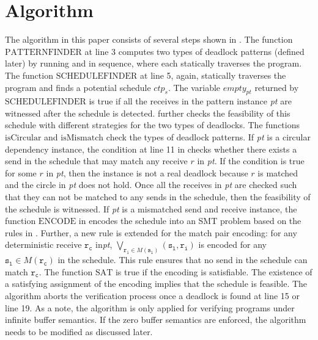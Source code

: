 \section{Algorithm}

\examplefigone

The algorithm in this paper consists of several steps shown in . The function $\mathrm{PATTERNFINDER}$ at line 3 computes two types of deadlock patterns (defined later) by running  and  in sequence, where each statically traverses the program. The function $\mathrm{SCHEDULEFINDER}$ at line 5, again, statically traverses the program and finds a potential schedule $\mathit{ctp}_s$. The variable $\mathit{empty}_{pt}$ returned by $\mathrm{SCHEDULEFINDER}$ is true if all the receives in the pattern instance \textit{pt} are witnessed after the schedule is detected.  further checks the feasibility of this schedule with different strategies for the two types of deadlocks. The functions $\mathrm{isCircular}$ and $\mathrm{isMismatch}$ check the types of deadlock patterns. If \textit{pt} is a circular dependency instance, the condition at line 11 in  checks whether there exists a send in the schedule that may match any receive $\mathit{r}$ in \textit{pt}. If the condition is true for some $\mathit{r}$ in \textit{pt}, then the instance is not a real deadlock because $\mathit{r}$ is matched and the circle in \textit{pt} does not hold. Once all the receives in \textit{pt} are checked such that they can not be matched to any sends in the schedule, then the feasibility of the schedule is witnessed. If \textit{pt} is a mismatched send and receive instance, the function $\mathrm{ENCODE}$ in  encodes the schedule into an SMT problem based on the rules in \cite{DBLP:conf/kbse/HuangMM13}. Further, a new rule is extended for the match pair encoding: for any deterministic receive $\mathtt{r_c}$ in\textit{pt}, $\bigvee_{\mathtt{r_i}\in\mathit{M}(\mathtt{s_l})}(\mathtt{s_l},\mathtt{r_i})$ is encoded for any $\mathtt{s_l}\in\mathit{M}(\mathtt{r_c})$ in the schedule. This rule ensures that no send in the schedule can match $\mathtt{r_c}$. The function $\mathrm{SAT}$ is true if the encoding is satisfiable. The existence of a satisfying assignment of the encoding implies that the schedule is feasible. The algorithm aborts the verification process once a deadlock is found at line 15 or line 19. As a note, the algorithm is only applied for verifying programs under infinite buffer semantics. If the zero buffer semantics are enforced, the algorithm needs to be modified as discussed later.

